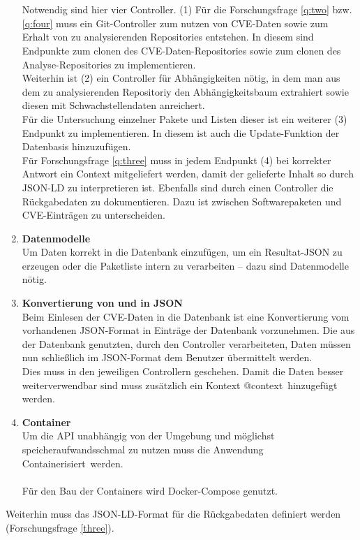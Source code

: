 \begin{enumerate}
            \\ \\
            Notwendig sind hier vier Controller.
            (1) Für die Forschungsfrage \ref{q:two} bzw. \ref{q:four} muss ein Git-Controller zum nutzen von \ac{CVE}-Daten sowie zum Erhalt von zu analysierenden Repositories entstehen.
            In diesem sind Endpunkte zum clonen des \ac{CVE}-Daten-Repositories sowie zum clonen des Analyse-Repositories zu implementieren. %
            \\
            Weiterhin ist (2) ein Controller für Abhängigkeiten nötig, in dem man aus dem zu analysierenden Repositoriy den Abhängigkeitsbaum extrahiert sowie diesen mit Schwachstellendaten anreichert.
            \\
            Für die Untersuchung einzelner Pakete und Listen dieser ist ein weiterer (3) Endpunkt zu implementieren.
            In diesem ist auch die Update-Funktion der Datenbasis hinzuzufügen.
            \\
            Für Forschungsfrage \ref{q:three} muss in jedem Endpunkt (4) bei korrekter Antwort ein Context mitgeliefert werden, damit der gelieferte Inhalt so durch JSON-LD zu interpretieren ist.
            Ebenfalls sind durch einen Controller die Rückgabedaten zu dokumentieren.
            Dazu ist zwischen Softwarepaketen und \ac{CVE}-Einträgen zu unterscheiden.
        \item \textbf{Datenmodelle} \label{arch_4}\\
            Um Daten korrekt in die Datenbank einzufügen, um ein Resultat-JSON zu erzeugen oder die Paketliste intern zu verarbeiten -- dazu sind Datenmodelle nötig.
        \item \textbf{Konvertierung von und in JSON} \label{arch_5}\\
            Beim Einlesen der \ac{CVE}-Daten in die Datenbank ist eine Konvertierung vom vorhandenen JSON-Format in Einträge der Datenbank vorzunehmen.
            Die aus der Datenbank genutzten, durch den Controller verarbeiteten, Daten müssen nun schließlich im JSON-Format dem Benutzer übermittelt werden.
            \\
            Dies muss in den jeweiligen Controllern geschehen.
            Damit die Daten besser weiterverwendbar sind muss zusätzlich ein Kontext \glqq @context\grqq~hinzugefügt werden.
        \item \textbf{Container} \\
            Um die \ac{API} unabhängig von der Umgebung und möglichst speicheraufwandsschmal zu nutzen muss die Anwendung \glqq Containerisiert\grqq~werden.
            \\ \\
            Für den Bau der Containers wird Docker-Compose genutzt.
    \end{enumerate}
    Weiterhin muss das JSON-LD-Format für die Rückgabedaten definiert werden (Forschungsfrage \ref{three}).
